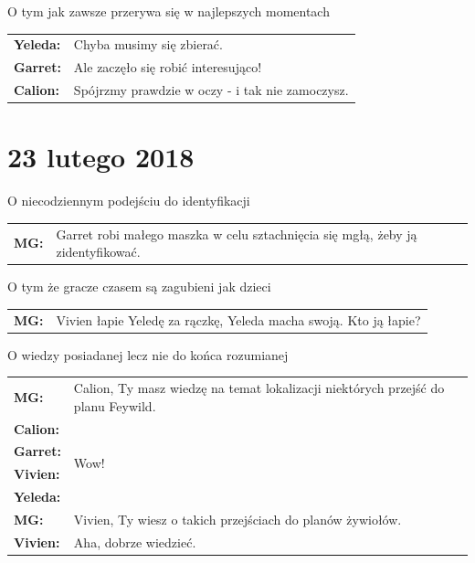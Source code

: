 \documentclass[10pt,twoside,twocolumn]{book}
\begin{document}
\begin{rpg-quotebox}{O tym jak zawsze przerywa się w najlepszych momentach}
   \begin{tabularx}{\columnwidth}{lX}
      \textbf{Yeleda:} & Chyba musimy się zbierać.\\
      \textbf{Garret:} & Ale zaczęło się robić interesująco!\\
      \textbf{Calion:} & Spójrzmy prawdzie w oczy - i tak nie zamoczysz.\\
   \end{tabularx}
\end{rpg-quotebox}


\section*{23 lutego 2018}

\begin{rpg-quotebox}{O niecodziennym podejściu do identyfikacji}
   \begin{tabularx}{\columnwidth}{lX}
      \textbf{MG:} & Garret robi małego maszka w celu sztachnięcia się mgłą, żeby ją zidentyfikować.\\
   \end{tabularx}
\end{rpg-quotebox}

\begin{rpg-quotebox}{O tym że gracze czasem są zagubieni jak dzieci}
   \begin{tabularx}{\columnwidth}{lX}
      \textbf{MG:} & Vivien łapie Yeledę za rączkę, Yeleda macha swoją. Kto ją łapie?\\
   \end{tabularx}
\end{rpg-quotebox}

\begin{rpg-quotebox}{O wiedzy posiadanej lecz nie do końca rozumianej}
   \begin{tabularx}{\columnwidth}{lX}
      \textbf{MG:} & Calion, Ty masz wiedzę na temat lokalizacji niektórych przejść do planu Feywild.\\
      \textbf{Calion:} & \multirow{4}{*}{Wow!}\\
      \textbf{Garret:} & \\
      \textbf{Vivien:} & \\
      \textbf{Yeleda:} & \\
      \textbf{MG:} & Vivien, Ty wiesz o takich przejściach do planów żywiołów.\\
      \textbf{Vivien:} & Aha, dobrze wiedzieć.\\
   \end{tabularx}
\end{rpg-quotebox}
\end{document}
